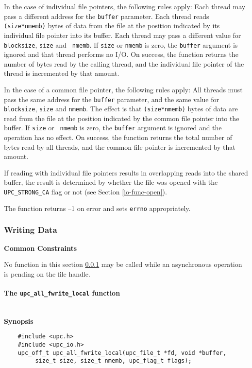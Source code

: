 \documentclass[12pt,titlepage]{article}
\newcounter{parnum}
\newcommand\np{\addtocounter{parnum}{1}\hspace{-2em}\makebox[2em][l]{\arabic{parnum}}}
\begin{document}
\np In the case of individual file pointers, the following rules apply: Each
thread may pass a different address for the {\tt buffer} parameter. 
Each thread reads {\tt (size*nmemb)} bytes of data from the
file at the position indicated by its individual file pointer into its buffer.
Each thread may pass a different value for {\tt blocksize}, {\tt size} and {\tt
nmemb}. If {\tt size} or {\tt nmemb} is zero, the {\tt buffer} argument is
ignored and that thread performs no I/O.  On success, the function returns the
number of bytes read by the calling thread, and the individual file pointer of
the thread is incremented by that amount.

\np In the case of a common file pointer, the following rules apply: All
threads must pass the same address for the {\tt buffer} parameter, and the 
same value for {\tt blocksize}, {\tt size} and {\tt nmemb}. The effect is that
{\tt (size*nmemb)} bytes of data are read from the file at the position
indicated by the common file pointer into the buffer.  If {\tt size} or {\tt
nmemb} is zero, the {\tt buffer} argument is ignored and the operation has no
effect.  On success, the function returns the total number of bytes read by all threads,
and the common file pointer is incremented by that amount.

\np If reading with individual file pointers results in overlapping reads into the
shared buffer, the result is determined by whether the file was opened with
the {\tt UPC\_STRONG\_CA} flag or not (see Section \ref{io-func-open}).

\np The function returns --1 on error and sets {\tt errno} appropriately.

\subsubsection{Writing Data}
\label{io-func-write}
{\bf Common Constraints}

\np No function in this section \ref{io-func-write} may be called while an asynchronous
operation is pending on the file handle.

\paragraph{The {\tt upc\_all\_fwrite\_local} function}\ \\

{\bf Synopsis}

\np\vspace{-2.5em}
\begin{verbatim}
    #include <upc.h>
    #include <upc_io.h>
    upc_off_t upc_all_fwrite_local(upc_file_t *fd, void *buffer,
         size_t size, size_t nmemb, upc_flag_t flags);
\end{verbatim}
\end{document}
